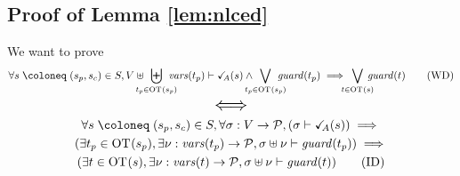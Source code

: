 \documentclass{article}
\begin{document}
\subsection{Proof of Lemma \ref{lem:nlced}}\label{apx:lemnlced}
We want to prove
\[ \forall s \defobject \mpar{s_p, s_c} \in S, V \uplus \biguplus_\subbox{t_p \in \fOT{s_p}} \fvars{t_p} \vdash \reach{A}\mpar{s} \wedge \bigvee_\subbox{t_p \in \fOT{s_p}} \fguard{t_p} \implies \bigvee_\subbox{t \in \fOT{s}} \fguard{t} \tag{WD}\label{eq:nlcWD} \]
\[ \text{\Large\(\displaystyle \iff\)} \]
\begin{multline*}
	\forall s \defobject \mpar{s_p, s_c} \in S, \forall \sigma: V \to \values, \mpar{\sigma \vdash \reach{A}\mpar{s}} \implies \\
	\mpar{\exists t_p \in \fOT{s_p}, \exists \nu: \fvars{t_p} \to \values, \sigma \uplus \nu \vdash \fguard{t_p}} \implies \\
	\mpar{\exists t \in \fOT{s}, \exists \nu: \fvars{t} \to \values, \sigma \uplus \nu \vdash \fguard{t}} \tag{ID}\label{eq:nlcID}
\end{multline*}
\end{document}
